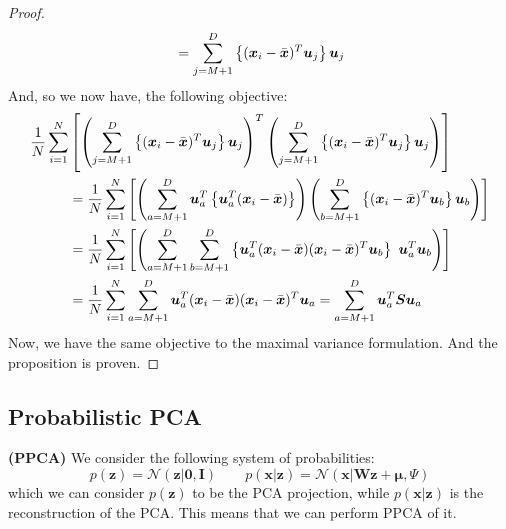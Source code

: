 \begin{proof}
\begin{equation*}
\begin{aligned}
        &= \sum^D_{j=M+1}\left\{ (\boldsymbol x_i - \bar{\boldsymbol x})^T\boldsymbol u_j \right\}\boldsymbol u_j \\
    \end{aligned}
    \end{equation*}
    And, so we now have, the following objective:
    \allowdisplaybreaks
    \begin{align*}
        \frac{1}{N}\sum^N_{i=1}&\left[ \left( \sum^D_{j=M+1}\left\{ (\boldsymbol x_i - \bar{\boldsymbol x})^T\boldsymbol u_j \right\}\boldsymbol u_j \right)^T\left( \sum^D_{j=M+1}\left\{ (\boldsymbol x_i - \bar{\boldsymbol x})^T\boldsymbol u_j \right\}\boldsymbol u_j \right) \right] \\
        &= \frac{1}{N}\sum^N_{i=1}\left[ \left( \sum^D_{a=M+1}\boldsymbol u_a^T\left\{ \boldsymbol u_a^T(\boldsymbol x_i - \bar{\boldsymbol x})  \right\}  \right)\left( \sum^D_{b=M+1}\left\{ (\boldsymbol x_i - \bar{\boldsymbol x})^T\boldsymbol u_b \right\}\boldsymbol u_b \right) \right]\\
        &= \frac{1}{N}\sum^N_{i=1}\left[ \left( \sum^D_{a=M+1}\sum^D_{b=M+1}\left\{ \boldsymbol u_a^T(\boldsymbol x_i - \bar{\boldsymbol x}) (\boldsymbol x_i - \bar{\boldsymbol x})^T\boldsymbol u_b \right\} \ \boldsymbol u_a^T \boldsymbol u_b \right) \right]\\
        &= \frac{1}{N}\sum^N_{i=1}\sum^D_{a=M+1}\boldsymbol u_a^T(\boldsymbol x_i - \bar{\boldsymbol x}) (\boldsymbol x_i - \bar{\boldsymbol x})^T\boldsymbol u_a = \sum^D_{a=M+1}\boldsymbol u_a^T \boldsymbol S \boldsymbol u_a
    \end{align*}
    Now, we have the same objective to the maximal variance formulation. And the proposition is proven. 
\end{proof}

\subsection{Probabilistic PCA}

\begin{definition}{\textbf{(PPCA)}}
    We consider the following system of probabilities:
    \begin{equation*}
        p(\boldsymbol z) = \mathcal{N}(\boldsymbol z | \boldsymbol 0,\boldsymbol  I) \qquad p(\boldsymbol x|\boldsymbol z) = \mathcal{N}(\boldsymbol x | \boldsymbol W\boldsymbol z + \boldsymbol \mu, \Psi)
    \end{equation*}
    which we can consider $p(\boldsymbol z)$ to be the PCA projection, while $p(\boldsymbol x|\boldsymbol z)$ is the reconstruction of the PCA. This means that we can perform PPCA of it. 
\end{definition}

